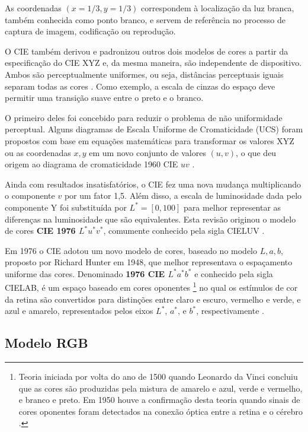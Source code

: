As coordenadas $(x = 1/3, y = 1/3)$ correspondem à localização da luz branca, também conhecida como ponto branco, e servem de referência no processo de captura de imagem, codificação ou reprodução.

O CIE também derivou e padronizou outros dois modelos de cores a partir da especificação do CIE XYZ e, da mesma maneira, são independente de dispositivo. Ambos são perceptualmente uniformes, ou seja, distâncias perceptuais iguais separam todas as cores \citep{vezhnevets:03}. Como exemplo, a escala de cinzas do espaço deve permitir uma transição suave entre o preto e o branco.

O primeiro deles foi concebido para reduzir o problema de não uniformidade perceptual. Alguns diagramas de Escala Uniforme de Cromaticidade (UCS) foram propostos com base em equações matemáticas para transformar os valores XYZ ou as coordenadas $x, y$ em um novo conjunto de valores $(u, v)$, o que deu origem ao diagrama de cromaticidade 1960 CIE $uv$ \citep{gevers:12}.

Ainda com resultados insatisfatórios, o CIE fez uma nova mudança multiplicando o componente $v$ por um fator 1,5. Além disso, a escala de luminosidade dada pelo componente Y foi substituída por $L^* = [0, 100]$ para melhor representar as diferenças na luminosidade que são equivalentes. Esta revisão originou o modelo de cores \textbf{CIE 1976 $L^*u^*v^*$}, comumente conhecido pela sigla CIELUV \citep{gevers:12}.

Em 1976 o CIE adotou um novo modelo de cores, baseado no modelo $L, a, b$, proposto por Richard Hunter em 1948, que melhor representava o espaçamento uniforme das cores. Denominado \textbf{1976 CIE $L^*a^*b^*$} e conhecido pela sigla CIELAB, é um espaço baseado em cores oponentes \footnote{Teoria iniciada por volta do ano de 1500 quando Leonardo da Vinci concluiu que as cores são produzidas pela mistura de amarelo e azul, verde e vermelho, e branco e preto. Em 1950 houve a confirmação desta teoria quando sinais de cores oponentes foram detectados na conexão óptica entre a retina e o cérebro \citep{gevers:12}.} no qual os estímulos de cor da retina são convertidos para distinções entre claro e escuro, vermelho e verde, e azul e amarelo, representados pelos eixos $L^*$, $a^*$, e $b^*$, respectivamente \citep{gevers:12}.

\subsection{Modelo RGB}
\label{sec:modelo_cores_rgb}

